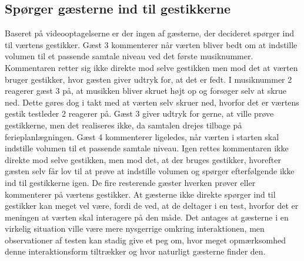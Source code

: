 \subsection{Spørger gæsterne ind til gestikkerne}
\label{TestresultaterSocialAcceptGaestSPGGestikker}
%
Baseret på videooptagelserne er der ingen af gæsterne, der decideret spørger ind til værtens gestikker. Gæst 3 kommenterer når værten bliver bedt om at indstille volumen til et passende samtale niveau ved det første musiknummer. Kommentaren retter sig ikke direkte mod selve gestikken men mod det at værten bruger gestikker, hvor gæsten giver udtryk for, at det er fedt. I musiknummer 2 reagerer gæst 3 på, at musikken bliver skruet højt op og forsøger selv at skrue ned. Dette gøres dog i takt med at værten selv skruer ned, hvorfor det er værtens gestik testleder 2 reagerer på. Gæst 3 giver udtryk for gerne, at ville prøve gestikkerne, men det realiseres ikke, da samtalen drejes tilbage på ferieplanlægningen. Gæst 4 kommenterer ligeledes, når værten i starten skal indstille volumen til et passende samtale niveau. Igen rettes kommentaren ikke direkte mod selve gestikken, men mod det, at der bruges gestikker, hvorefter gæsten selv får lov til at prøve at indstille volumen og spørger efterfølgende ikke ind til gestikkerne igen. De fire resterende gæster hverken prøver eller kommenterer på værtens gestikker. At gæsterne ikke direkte spørger ind til gestikker kan meget vel være, fordi de ved, at de deltager i en test, hvorfor det er meningen at værten skal interagere på den måde. Det antages at gæsterne i en virkelig situation ville være mere nysgerrige omkring interaktionen, men observationer af testen kan stadig give et peg om, hvor meget opmærksomhed denne interaktionsform tiltrækker og hvor naturligt gæsterne finder den.
%
